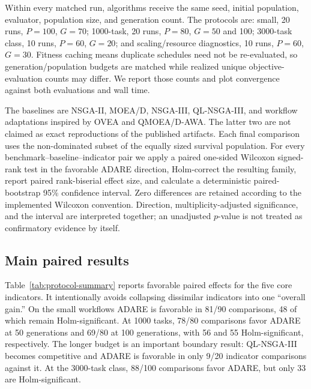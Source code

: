 \documentclass[preprint,12pt]{elsarticle}
\begin{document}
Within every matched run, algorithms receive the same seed, initial population, evaluator, population size, and generation count. The protocols are: small, 20 runs, $P=100$, $G=70$; 1000-task, 20 runs, $P=80$, $G=50$ and 100; 3000-task class, 10 runs, $P=60$, $G=20$; and scaling/resource diagnostics, 10 runs, $P=60$, $G=30$. Fitness caching means duplicate schedules need not be re-evaluated, so generation/population budgets are matched while realized unique objective-evaluation counts may differ. We report those counts and plot convergence against both evaluations and wall time.

The baselines are NSGA-II, MOEA/D, NSGA-III, QL-NSGA-III, and workflow adaptations inspired by OVEA and QMOEA/D-AWA. The latter two are not claimed as exact reproductions of the published artifacts. Each final comparison uses the non-dominated subset of the equally sized survival population. For every benchmark--baseline--indicator pair we apply a paired one-sided Wilcoxon signed-rank test \cite{wilcoxon1945} in the favorable ADARE direction, Holm-correct the resulting family, report paired rank-biserial effect size, and calculate a deterministic paired-bootstrap 95\% confidence interval. Zero differences are retained according to the implemented Wilcoxon convention. Direction, multiplicity-adjusted significance, and the interval are interpreted together; an unadjusted $p$-value is not treated as confirmatory evidence by itself.

\subsection{Main paired results}
Table~\ref{tab:protocol-summary} reports favorable paired effects for the five core indicators. It intentionally avoids collapsing dissimilar indicators into one ``overall gain.'' On the small workflows ADARE is favorable in 81/90 comparisons, 48 of which remain Holm-significant. At 1000 tasks, 78/80 comparisons favor ADARE at 50 generations and 69/80 at 100 generations, with 56 and 55 Holm-significant, respectively. The longer budget is an important boundary result: QL-NSGA-III becomes competitive and ADARE is favorable in only 9/20 indicator comparisons against it. At the 3000-task class, 88/100 comparisons favor ADARE, but only 33 are Holm-significant.

\begin{table}[t]
\caption{Directional paired evidence across the confirmatory protocols. A ``win'' means a favorable paired effect, not necessarily statistical significance.}
\label{tab:protocol-summary}
\centering\small
\resizebox{\textwidth}{!}{}
\end{table}
\end{document}
